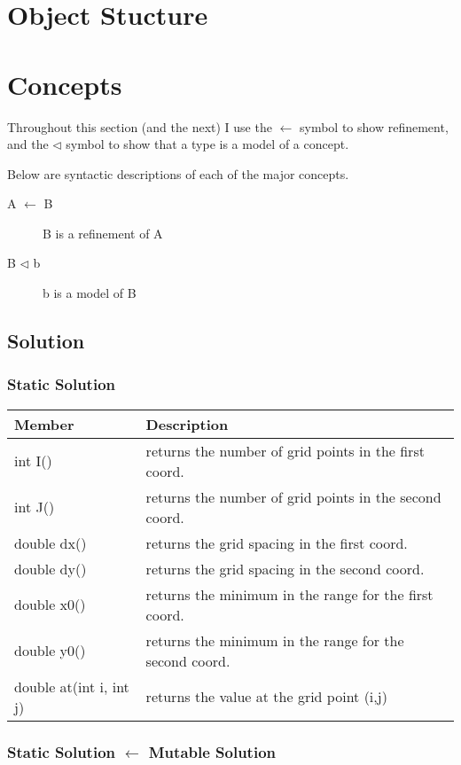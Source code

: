 \documentclass{article}
\begin{document}
\section{Object Stucture}

\section{Concepts}


Throughout this section (and the next) I use the $\leftarrow$ symbol to show refinement,
and the $\triangleleft$ symbol to show that a type is a model of a concept.

Below are syntactic descriptions of each of the major concepts.

\begin{description}
\item[A $\leftarrow$ B] B is a refinement of A
\item[B $\triangleleft$ b] b is a model of B
\end{description}

\subsection{Solution}
\subsubsection{Static Solution}

\begin{tabular}[!htb]{|p{5.25 cm}|p{8 cm}|}
\hline
Member&	Description\\
\hline
int I()&	returns the number of grid points in the first coord.\\
\hline
int J()&	returns the number of grid points in the second coord.\\
\hline
double dx()&	returns the grid spacing in the first coord.\\
\hline
double dy()&	returns the grid spacing in the second coord.\\
\hline
double x0()&	returns the minimum in the range for the first coord.\\
\hline
double y0()&	returns the minimum in the range for the second coord.\\
\hline
double at(int i, int j)&	returns the value at the grid point (i,j)\\
\hline
\end{tabular}

\subsubsection{Static Solution $\leftarrow$ Mutable Solution}
\end{document}
